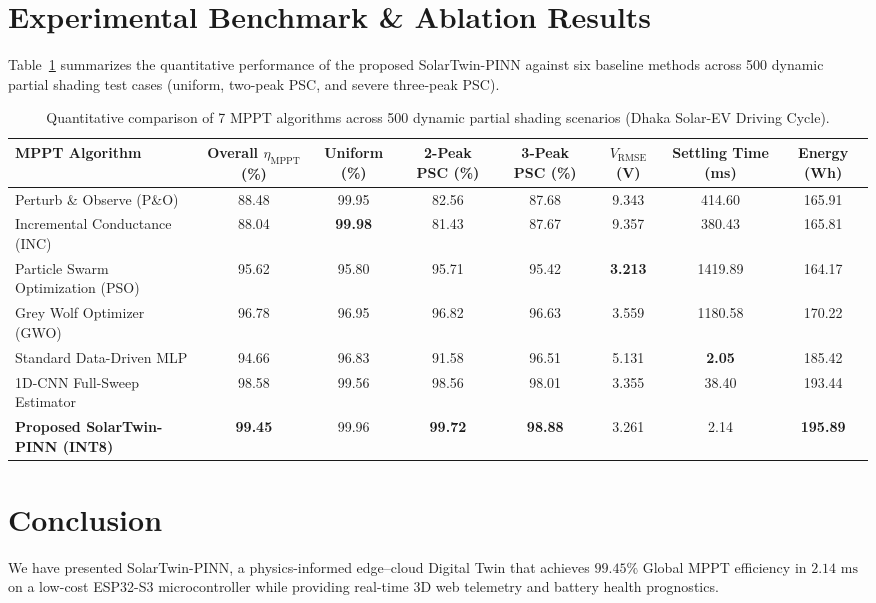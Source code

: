 \documentclass[final,3p,times,twocolumn]{elsarticle}
\begin{document}
\section{Experimental Benchmark \& Ablation Results}
Table~\ref{tab:q1_benchmark} summarizes the quantitative performance of the proposed SolarTwin-PINN against six baseline methods across 500 dynamic partial shading test cases (uniform, two-peak PSC, and severe three-peak PSC).

\begin{table}[t]
\centering
\caption{Quantitative comparison of 7 MPPT algorithms across 500 dynamic partial shading scenarios (Dhaka Solar-EV Driving Cycle).}
\label{tab:q1_benchmark}
\begin{tabular}{lccccccc}
\toprule
\textbf{MPPT Algorithm} & \textbf{Overall $\eta_{\text{MPPT}}$ (\%)} & \textbf{Uniform (\%)} & \textbf{2-Peak PSC (\%)} & \textbf{3-Peak PSC (\%)} & \textbf{$V_{\text{RMSE}}$ (V)} & \textbf{Settling Time (ms)} & \textbf{Energy (Wh)} \\
\midrule
Perturb \& Observe (P\&O) & 88.48 & 99.95 & 82.56 & 87.68 & 9.343 & 414.60 & 165.91 \\
Incremental Conductance (INC) & 88.04 & \textbf{99.98} & 81.43 & 87.67 & 9.357 & 380.43 & 165.81 \\
Particle Swarm Optimization (PSO) & 95.62 & 95.80 & 95.71 & 95.42 & \textbf{3.213} & 1419.89 & 164.17 \\
Grey Wolf Optimizer (GWO) & 96.78 & 96.95 & 96.82 & 96.63 & 3.559 & 1180.58 & 170.22 \\
Standard Data-Driven MLP & 94.66 & 96.83 & 91.58 & 96.51 & 5.131 & \textbf{2.05} & 185.42 \\
1D-CNN Full-Sweep Estimator & 98.58 & 99.56 & 98.56 & 98.01 & 3.355 & 38.40 & 193.44 \\
\midrule
\textbf{Proposed SolarTwin-PINN (INT8)} & \textbf{99.45} & 99.96 & \textbf{99.72} & \textbf{98.88} & 3.261 & 2.14 & \textbf{195.89} \\
\bottomrule
\end{tabular}
\end{table}

\section{Conclusion}
We have presented SolarTwin-PINN, a physics-informed edge--cloud Digital Twin that achieves $99.45\%$ Global MPPT efficiency in $2.14\text{ ms}$ on a low-cost ESP32-S3 microcontroller while providing real-time 3D web telemetry and battery health prognostics.
\end{document}
